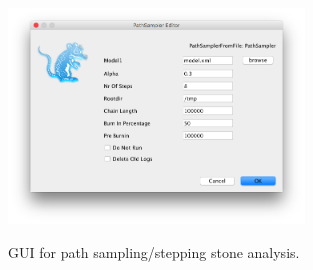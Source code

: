 {    \begin{figure}[htbp]
        \centering
        {\includegraphics[width=0.7\textwidth]{../screenshots/pathsampler}}
        \caption{GUI for path sampling/stepping stone analysis.}
        \label{fig:pathsampler}
    \end{figure}
}


